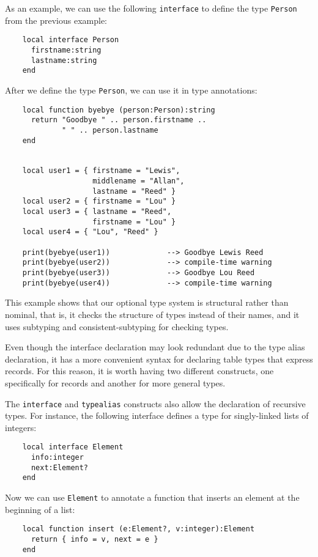 As an example, we can use the following \texttt{interface} to
define the type \texttt{Person} from the previous example:
\begin{verbatim}
    local interface Person
      firstname:string
      lastname:string
    end
\end{verbatim}

After we define the type \texttt{Person}, we can use it in type annotations:
\begin{verbatim}
    local function byebye (person:Person):string
      return "Goodbye " .. person.firstname ..
             " " .. person.lastname
    end


    local user1 = { firstname = "Lewis",
                    middlename = "Allan",
                    lastname = "Reed" }
    local user2 = { firstname = "Lou" }
    local user3 = { lastname = "Reed",
                    firstname = "Lou" }
    local user4 = { "Lou", "Reed" }

    print(byebye(user1))             --> Goodbye Lewis Reed 
    print(byebye(user2))             --> compile-time warning
    print(byebye(user3))             --> Goodbye Lou Reed
    print(byebye(user4))             --> compile-time warning
\end{verbatim}

This example shows that our optional type system is structural rather
than nominal, that is, it checks the structure of types instead of
their names, and it uses subtyping and consistent-subtyping for
checking types.

Even though the interface declaration may look redundant due to
the type alias declaration, it has a more convenient syntax
for declaring table types that express records.
For this reason, it is worth having two different constructs,
one specifically for records and another for more general types.

The \texttt{interface} and \texttt{typealias} constructs also allow
the declaration of recursive types.
For instance, the following interface defines a type for singly-linked
lists of integers:
\begin{verbatim}
    local interface Element
      info:integer
      next:Element?
    end
\end{verbatim}

Now we can use \texttt{Element} to annotate a function that
inserts an element at the beginning of a list:
\begin{verbatim}
    local function insert (e:Element?, v:integer):Element 
      return { info = v, next = e }
    end
\end{verbatim}

